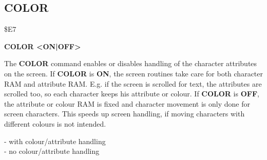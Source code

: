 
\newpage
\subsection{COLOR}
\begin{description}[leftmargin=3cm,style=nextline]
\item [Token:] \$E7
\item [Format:] {\bf COLOR <ON|OFF>}
\item [Usage:] The {\bf COLOR} command enables or disables
               handling of the character attributes on the screen.
               If {\bf COLOR} is {\bf ON}, the screen routines
               take care for both character RAM and attribute RAM.
               E.g. if the screen is scrolled for text, the attributes
               are scrolled too, so each character keeps his attribute
               or colour. If {\bf COLOR} is {\bf OFF}, the attribute
               or colour RAM is fixed and character movement is only
               done for screen characters. This speeds up screen
               handling, if moving characters with different colours is
               not intended.
\item [Example:]  - with colour/attribute handling \\
                  - no colour/attribute handling

\end{description}


\newpage
